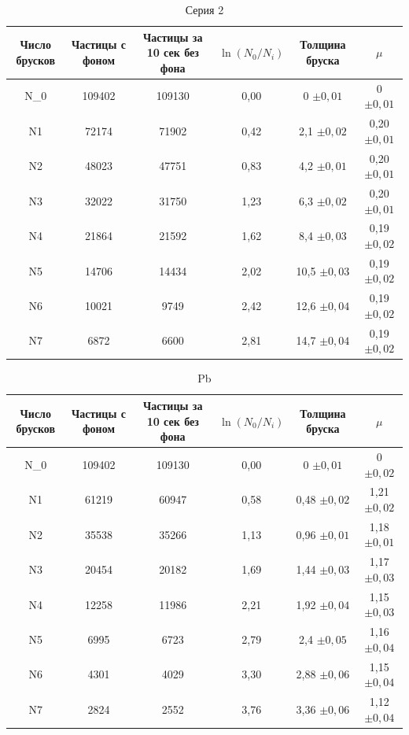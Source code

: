 \documentclass[a4paper]{article}
\begin{document}
\begin{table}[h]
\centering
\caption{Серия 2}
\begin{tabular}{|c|c|c|c|c|c|}
\hline
Число брусков & Частицы с фоном & Частицы за 10 сек без фона & $\ln(N_0/N_i)$ & Толщина бруска & $\mu$ \\
\hline
N\_0 & 109402 & 109130 & 0,00 & 0  $\pm 0,01$ & 0 $\pm 0,01$ \\
N1 & 72174 & 71902 & 0,42 & 2,1  $\pm 0,02$& 0,20  $\pm 0,01$\\
N2 & 48023 & 47751 & 0,83 & 4,2 $\pm 0,01$ & 0,20  $\pm 0,01$\\
N3 & 32022 & 31750 & 1,23 & 6,3 $\pm 0,02$ & 0,20  $\pm 0,01$\\
N4 & 21864 & 21592 & 1,62 & 8,4 $\pm 0,03$ & 0,19 $\pm 0,02$ \\
N5 & 14706 & 14434 & 2,02 & 10,5 $\pm 0,03$ & 0,19  $\pm 0,02$\\
N6 & 10021 & 9749 & 2,42 & 12,6 $\pm 0,04$ & 0,19 $\pm 0,02$ \\
N7 & 6872 & 6600 & 2,81 & 14,7  $\pm 0,04$& 0,19  $\pm 0,02$\\
\hline
\end{tabular}
\end{table}

\begin{table}[h]
\centering
\caption{Pb}
\begin{tabular}{|c|c|c|c|c|c|}
\hline
Число брусков & Частицы с фоном & Частицы за 10 сек без фона & $\ln(N_0/N_i)$ & Толщина бруска & $\mu$ \\
\hline
N\_0 & 109402 & 109130 & 0,00 & 0 $\pm 0,01$& 0 $\pm 0,02$ \\
N1 & 61219 & 60947 & 0,58 & 0,48 $\pm 0,02$ & 1,21 $\pm 0,02$ \\
N2 & 35538 & 35266 & 1,13 & 0,96 $\pm 0,01$ & 1,18 $\pm 0,01$\\
N3 & 20454 & 20182 & 1,69 & 1,44 $\pm 0,03$ & 1,17 $\pm 0,03$\\
N4 & 12258 & 11986 & 2,21 & 1,92 $\pm 0,04$& 1,15 $\pm 0,03$\\
N5 & 6995 & 6723 & 2,79 & 2,4 $\pm 0,05$& 1,16 $\pm 0,04$\\
N6 & 4301 & 4029 & 3,30 & 2,88 $\pm 0,06$& 1,15 $\pm 0,04$\\
N7 & 2824 & 2552 & 3,76 & 3,36 $\pm 0,06$& 1,12 $\pm 0,04$\\
\hline
\end{tabular}
\end{table}
\end{document}
